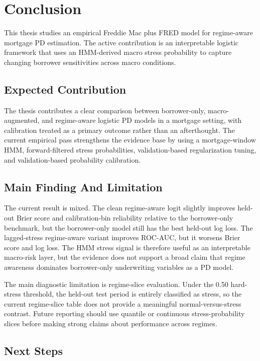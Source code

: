 \chapter{Conclusion}

This thesis studies an empirical Freddie Mac plus FRED model for regime-aware mortgage PD estimation. The active contribution is an interpretable logistic framework that uses an HMM-derived macro stress probability to capture changing borrower sensitivities across macro conditions.

\section{Expected Contribution}

The thesis contributes a clear comparison between borrower-only, macro-augmented, and regime-aware logistic PD models in a mortgage setting, with calibration treated as a primary outcome rather than an afterthought. The current empirical pass strengthens the evidence base by using a mortgage-window HMM, forward-filtered stress probabilities, validation-based regularization tuning, and validation-based probability calibration.

\section{Main Finding And Limitation}

The current result is mixed. The clean regime-aware logit slightly improves held-out Brier score and calibration-bin reliability relative to the borrower-only benchmark, but the borrower-only model still has the best held-out log loss. The lagged-stress regime-aware variant improves ROC-AUC, but it worsens Brier score and log loss. The HMM stress signal is therefore useful as an interpretable macro-risk layer, but the evidence does not support a broad claim that regime awareness dominates borrower-only underwriting variables as a PD model.

The main diagnostic limitation is regime-slice evaluation. Under the 0.50 hard-stress threshold, the held-out test period is entirely classified as stress, so the current regime-slice table does not provide a meaningful normal-versus-stress contrast. Future reporting should use quantile or continuous stress-probability slices before making strong claims about performance across regimes.

\section{Next Steps}

